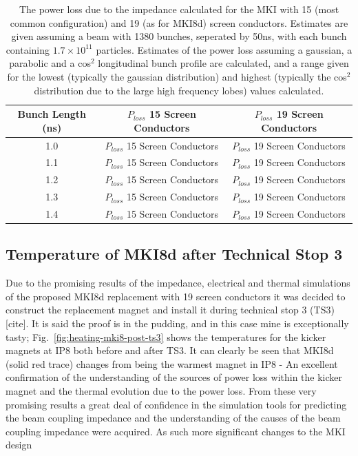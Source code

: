 \begin{table}
\label{tab:heating-15-19-cond}
\caption{The power loss due to the impedance calculated for the MKI with 15 (most common configuration) and 19 (as for MKI8d) screen conductors. Estimates are given assuming a beam with 1380 bunches, seperated by 50ns, with each bunch containing $1.7 \times 10^{11}$ particles. Estimates of the power loss assuming a gaussian, a parabolic and a cos$^{2}$ longitudinal bunch profile are calculated, and a range given for the lowest (typically the gaussian distribution) and highest (typically the cos$^{2}$ distribution due to the large high frequency lobes) values calculated.}
\begin{center}
\begin{tabular}{c | c | c}
Bunch Length (ns) & $P_{loss}$ 15 Screen Conductors & $P_{loss}$ 19 Screen Conductors \\ \hline
1.0 & $P_{loss}$ 15 Screen Conductors & $P_{loss}$ 19 Screen Conductors \\ \hline
1.1 & $P_{loss}$ 15 Screen Conductors & $P_{loss}$ 19 Screen Conductors \\ \hline
1.2 & $P_{loss}$ 15 Screen Conductors & $P_{loss}$ 19 Screen Conductors \\ \hline
1.3 & $P_{loss}$ 15 Screen Conductors & $P_{loss}$ 19 Screen Conductors \\ \hline
1.4 & $P_{loss}$ 15 Screen Conductors & $P_{loss}$ 19 Screen Conductors \\ \hline
\end{tabular}
\end{center}
\end{table}

\subsection{Temperature of MKI8d after Technical Stop 3}

Due to the promising results of the impedance, electrical and thermal simulations of the proposed MKI8d replacement with 19 screen conductors it was decided to construct the replacement magnet and install it during technical stop 3 (TS3)[cite]. It is said the proof is in the pudding, and in this case mine is exceptionally tasty; Fig.~\ref{fig:heating-mki8-post-ts3} shows the temperatures for the kicker magnets at IP8 both before and after TS3. It can clearly be seen that MKI8d (solid red trace) changes from being the warmest magnet in IP8 - An excellent confirmation of the understanding of the sources of power loss within the kicker magnet and the thermal evolution due to the power loss. From these very promising results a great deal of confidence in the simulation tools for predicting the beam coupling impedance and the understanding of the causes of the beam coupling impedance were acquired. As such more significant changes to the MKI design


